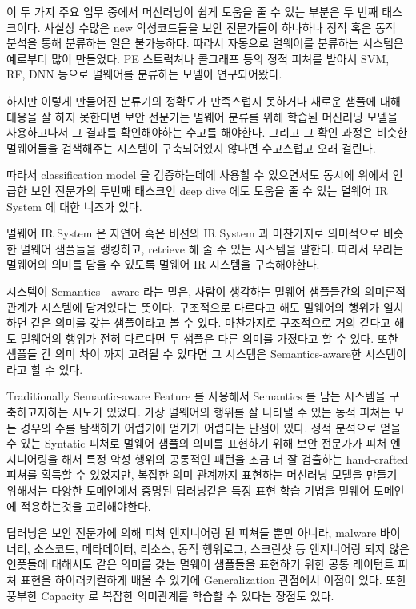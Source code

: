 이 두 가지 주요 업무 중에서 머신러닝이 쉽게 도움을 줄 수 있는 부분은 두 번째 태스크이다. 사실상 수많은 new 악성코드들을 보안 전문가들이 하나하나 정적 혹은 동적 분석을 통해 분류하는 일은 불가능하다. 따라서 자동으로 멀웨어를 분류하는 시스템은 예로부터 많이 만들었다. PE 스트럭쳐나 콜그래프 등의 정적 피쳐를 받아서 SVM, RF, DNN 등으로 멀웨어를 분류하는 모델이 연구되어왔다.   

하지만 이렇게 만들어진 분류기의 정확도가 만족스럽지 못하거나 새로운 샘플에 대해 대응을 잘 하지 못한다면 보안 전문가는 멀웨어 분류를 위해 학습된 머신러닝 모델을 사용하고나서 그 결과를 확인해야하는 수고를 해야한다. 그리고 그 확인 과정은 비슷한 멀웨어들을 검색해주는 시스템이 구축되어있지 않다면 수고스럽고 오래 걸린다. 

따라서 classification model 을 검증하는데에 사용할 수 있으면서도 동시에 위에서 언급한 보안 전문가의 두번째 태스크인 deep dive 에도 도움을 줄 수 있는 멀웨어 IR System 에 대한 니즈가 있다.  

멀웨어 IR System 은 자연어 혹은 비젼의 IR System 과 마찬가지로 의미적으로 비슷한 멀웨어 샘플들을 랭킹하고, retrieve 해 줄 수 있는 시스템을 말한다. 따라서 우리는 멀웨어의 의미를 담을 수 있도록 멀웨어 IR 시스템을 구축해야한다. 

시스템이 Semantics - aware 라는 말은, 사람이 생각하는 멀웨어 샘플들간의 의미론적 관계가 시스템에 담겨있다는 뜻이다. 구조적으로 다르다고 해도 멀웨어의 행위가 일치하면 같은 의미를 갖는 샘플이라고 볼 수 있다. 마찬가지로 구조적으로 거의 같다고 해도 멀웨어의 행위가 전혀 다르다면 두 샘플은 다른 의미를 가졌다고 할 수 있다. 또한 샘플들 간 의미 차이 까지 고려될 수 있다면 그 시스템은 Semantics-aware한 시스템이라고 할 수 있다. 
 
Traditionally Semantic-aware Feature 를 사용해서 Semantics 를 담는 시스템을 구축하고자하는 시도가 있었다. 가장 멀웨어의 행위를 잘 나타낼 수 있는 동적 피쳐는 모든 경우의 수를 탐색하기 어렵기에 얻기가 어렵다는 단점이 있다. 정적 분석으로 얻을 수 있는 Syntatic 피쳐로 멀웨어 샘플의 의미를 표현하기 위해 보안 전문가가 피쳐 엔지니어링을 해서 특정 악성 행위의 공통적인 패턴을 조금 더 잘 검출하는 hand-crafted 피쳐를 획득할 수 있었지만, 복잡한 의미 관계까지 표현하는 머신러닝 모델을 만들기 위해서는 다양한 도메인에서 증명된 딥러닝같은 특징 표현 학습 기법을 멀웨어 도메인에 적용하는것을 고려해야한다.
 
딥러닝은 보안 전문가에 의해 피쳐 엔지니어링 된 피쳐들 뿐만 아니라, malware 바이너리, 소스코드, 메타데이터, 리소스, 동적 행위로그, 스크린샷 등 엔지니어링 되지 않은 인풋들에 대해서도 같은 의미를 갖는 멀웨어 샘플들을 표현하기 위한 공통 레이턴트 피쳐 표현을 하이러키컬하게 배울 수 있기에 Generalization 관점에서 이점이 있다. 또한 풍부한 Capacity 로 복잡한 의미관계를 학습할 수 있다는 장점도 있다. 

